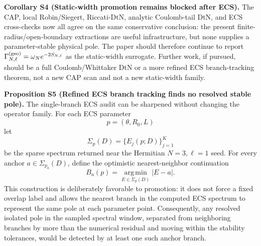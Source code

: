 \documentclass[aps,prd,onecolumn,notitlepage,nofootinbib,superscriptaddress,11pt,floatfix]{revtex4-2}
\begin{document}
\medskip\noindent\textbf{Corollary S4 (Static-width promotion remains blocked after ECS).}
The CAP, local Robin/Siegert, Riccati-DtN, analytic Coulomb-tail DtN, and ECS cross-checks now all agree on the same conservative conclusion: the present finite-radius/open-boundary extractions are useful infrastructure, but none supplies a parameter-stable physical pole.  The paper should therefore continue to report \(\Gamma_{N,\ell}^{\rm(geo)}=\omega_N e^{-2S_{N,\ell}}\) as the static-width surrogate.  Further work, if pursued, should be a full Coulomb/Whittaker DtN or a more refined ECS branch-tracking theorem, not a new CAP scan and not a new static-width family.

\medskip\noindent\textbf{Proposition S5 (Refined ECS branch tracking finds no resolved stable pole).}
The single-branch ECS audit can be sharpened without changing the operator family.  For each ECS parameter
\[
p=(\theta,R_0,L)
\]
let
\[
\Sigma_p(D)=\{E_j(p;D)\}_{j=1}^{K}
\]
be the sparse spectrum returned near the Hermitian \(N=3,\ell=1\) seed.  For every anchor \(a\in\Sigma_{p_a}(D)\), define the optimistic nearest-neighbor continuation
\[
B_a(p)=\operatorname*{arg\,min}_{E\in\Sigma_p(D)} |E-a|.
\]
This construction is deliberately favorable to promotion: it does not force a fixed overlap label and allows the nearest branch in the computed ECS spectrum to represent the same pole at each parameter point.  Consequently, any resolved isolated pole in the sampled spectral window, separated from neighboring branches by more than the numerical residual and moving within the stability tolerances, would be detected by at least one such anchor branch.
\end{document}
